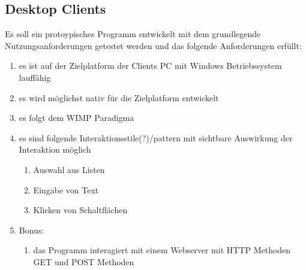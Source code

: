 \documentclass[11pt,oneside,a4paper,notitlepage]{article}
\begin{document}
\subsection{Desktop Clients}
%
Es soll ein protoypisches Programm entwickelt mit dem grundlegende Nutzungsanforderungen getestet werden und das folgende Anforderungen erfüllt:

\begin{enumerate}
\item es ist auf der Zielplatform der Clients PC mit Windows Betriebssystem lauffähig
\item es wird möglichst nativ für die Zielplatform entwickelt
\item es folgt dem WIMP Paradigma
\item es sind folgende Interaktionsstile(?)/pattern mit sichtbare Auswirkung der Interaktion möglich
\begin{enumerate}
\item Auswahl aus Listen 
\item Eingabe von Text
\item Klicken von Schaltflächen
\end{enumerate}
\item Bonus:
\begin{enumerate}
\item das Programm interagiert mit einem Webserver mit HTTP Methoden GET und POST Methoden
\end{enumerate}
\end{enumerate}
\noindent
\end{document}
